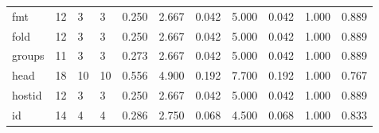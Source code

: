 \begin{longtable}{lp{1.2cm}p{1.2cm}p{1.2cm}p{1.2cm}p{1.2cm}p{1.2cm}p{1.2cm}p{1.2cm}p{1.2cm}p{1.2cm}}
fmt       &                           12 &                  3 &                                 3 &                                      0.250 &                                  2.667 &                                        0.042 &                             5.000 &                                   0.042 &                              1.000 &                                              0.889 \\
fold      &                           12 &                  3 &                                 3 &                                      0.250 &                                  2.667 &                                        0.042 &                             5.000 &                                   0.042 &                              1.000 &                                              0.889 \\
groups    &                           11 &                  3 &                                 3 &                                      0.273 &                                  2.667 &                                        0.042 &                             5.000 &                                   0.042 &                              1.000 &                                              0.889 \\
head      &                           18 &                 10 &                                10 &                                      0.556 &                                  4.900 &                                        0.192 &                             7.700 &                                   0.192 &                              1.000 &                                              0.767 \\
hostid    &                           12 &                  3 &                                 3 &                                      0.250 &                                  2.667 &                                        0.042 &                             5.000 &                                   0.042 &                              1.000 &                                              0.889 \\
id        &                           14 &                  4 &                                 4 &                                      0.286 &                                  2.750 &                                        0.068 &                             4.500 &                                   0.068 &                              1.000 &                                              0.833 \\

\end{longtable}
